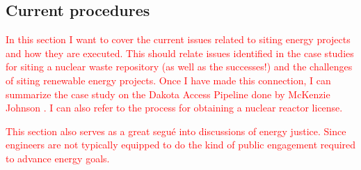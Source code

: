 \subsection{Current procedures}


\textcolor{red}{In this section I want to cover the current issues related to siting 
energy projects and how they are executed. This should relate issues identified in the case studies
for siting a nuclear waste repository (as well as the successes!) and the challenges of siting renewable
energy projects. Once I have made this connection, I can summarize the case study on the Dakota Access Pipeline
done by McKenzie Johnson \cite{johnson_dakota_2021}. I can also refer to the process for obtaining a nuclear
reactor license.

This section also serves as a great segu\'{e} into discussions of energy justice. Since engineers are not 
typically equipped to do the kind of public engagement required to advance energy goals.}